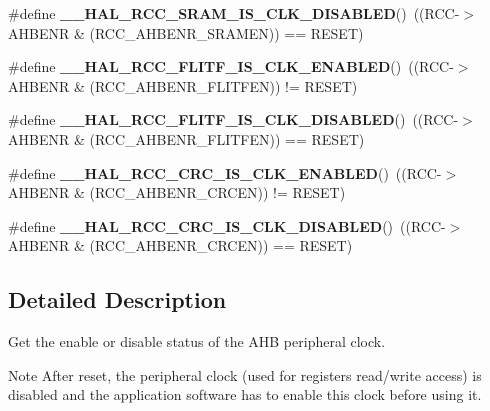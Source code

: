 \begin{DoxyCompactItemize}
\#define {\bfseries \+\_\+\+\_\+\+H\+A\+L\+\_\+\+R\+C\+C\+\_\+\+S\+R\+A\+M\+\_\+\+I\+S\+\_\+\+C\+L\+K\+\_\+\+D\+I\+S\+A\+B\+L\+ED}()~((R\+CC-\/$>$A\+H\+B\+E\+NR \& (R\+C\+C\+\_\+\+A\+H\+B\+E\+N\+R\+\_\+\+S\+R\+A\+M\+EN)) == R\+E\+S\+ET)
\item 
\mbox{\label{group___r_c_c___a_h_b___peripheral___clock___enable___disable___status_ga40f5675d8f45c678b8a2f43fca8f991e}} 
\#define {\bfseries \+\_\+\+\_\+\+H\+A\+L\+\_\+\+R\+C\+C\+\_\+\+F\+L\+I\+T\+F\+\_\+\+I\+S\+\_\+\+C\+L\+K\+\_\+\+E\+N\+A\+B\+L\+ED}()~((R\+CC-\/$>$A\+H\+B\+E\+NR \& (R\+C\+C\+\_\+\+A\+H\+B\+E\+N\+R\+\_\+\+F\+L\+I\+T\+F\+EN)) != R\+E\+S\+ET)
\item 
\mbox{\label{group___r_c_c___a_h_b___peripheral___clock___enable___disable___status_gaeab36991bb98be402aae3d70b0887658}} 
\#define {\bfseries \+\_\+\+\_\+\+H\+A\+L\+\_\+\+R\+C\+C\+\_\+\+F\+L\+I\+T\+F\+\_\+\+I\+S\+\_\+\+C\+L\+K\+\_\+\+D\+I\+S\+A\+B\+L\+ED}()~((R\+CC-\/$>$A\+H\+B\+E\+NR \& (R\+C\+C\+\_\+\+A\+H\+B\+E\+N\+R\+\_\+\+F\+L\+I\+T\+F\+EN)) == R\+E\+S\+ET)
\item 
\mbox{\label{group___r_c_c___a_h_b___peripheral___clock___enable___disable___status_ga0e1b25cbf589c1c47c1d069e4c803d56}} 
\#define {\bfseries \+\_\+\+\_\+\+H\+A\+L\+\_\+\+R\+C\+C\+\_\+\+C\+R\+C\+\_\+\+I\+S\+\_\+\+C\+L\+K\+\_\+\+E\+N\+A\+B\+L\+ED}()~((R\+CC-\/$>$A\+H\+B\+E\+NR \& (R\+C\+C\+\_\+\+A\+H\+B\+E\+N\+R\+\_\+\+C\+R\+C\+EN)) != R\+E\+S\+ET)
\item 
\mbox{\label{group___r_c_c___a_h_b___peripheral___clock___enable___disable___status_ga3d2645916b9ee9bad8c724a719c621d9}} 
\#define {\bfseries \+\_\+\+\_\+\+H\+A\+L\+\_\+\+R\+C\+C\+\_\+\+C\+R\+C\+\_\+\+I\+S\+\_\+\+C\+L\+K\+\_\+\+D\+I\+S\+A\+B\+L\+ED}()~((R\+CC-\/$>$A\+H\+B\+E\+NR \& (R\+C\+C\+\_\+\+A\+H\+B\+E\+N\+R\+\_\+\+C\+R\+C\+EN)) == R\+E\+S\+ET)
\end{DoxyCompactItemize}


\subsection{Detailed Description}
Get the enable or disable status of the A\+HB peripheral clock. 

\begin{DoxyNote}{Note}
After reset, the peripheral clock (used for registers read/write access) is disabled and the application software has to enable this clock before using it. 
\end{DoxyNote}
